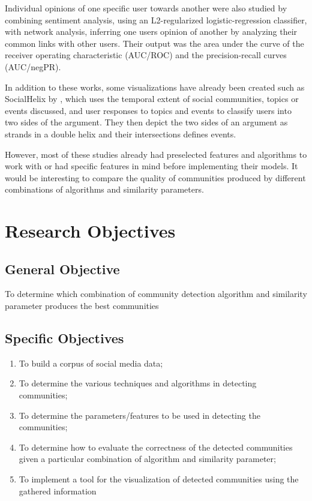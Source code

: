 Individual opinions of one specific user towards another were also studied by  combining sentiment analysis, using an L2-regularized logistic-regression classifier, with network analysis, inferring one user\vtick s opinion of another by analyzing their common links with other users. Their output was the area under the curve of the receiver operating characteristic (AUC/ROC) and the precision-recall curves (AUC/negPR). 

In addition to these works, some visualizations have already been created such as SocialHelix by , which uses the temporal extent of social communities, topics or events discussed, and user responses to topics and events to classify users into two sides of the argument. They then depict the two sides of an argument as strands in a double helix and their intersections defines events.

However, most of these studies already had preselected features and algorithms to work with or had specific features in mind before implementing their models. It would be interesting to compare the quality of communities produced by different combinations of algorithms and similarity parameters.

\section{Research Objectives}
\label{sec:researchobjectives}

\subsection{General Objective}
\label{sec:generalobjective}

To determine which combination of community detection algorithm and similarity parameter produces the best communities

\subsection{Specific Objectives}
\label{sec:specificobjectives}

\begin{enumerate}
	\item To build a corpus of social media data;
	\item To determine the various techniques and algorithms in detecting communities;
	\item To determine the parameters/features to be used in detecting the communities;
	\item To determine how to evaluate the correctness of the detected communities given a particular combination of algorithm and similarity parameter;
	\item To implement a tool for the visualization of detected communities using the gathered information
\end{enumerate}

